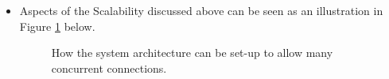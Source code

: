 		
\pagebreak	
\begin{itemize}
	\item Aspects of the Scalability discussed above can be seen as an illustration in Figure \ref{fig:scalability} below.
	\begin{figure}[H]
		\centering
		\caption{How the system architecture can be set-up to allow many concurrent connections.}
		\label{fig:scalability}
	\end{figure}
\end{itemize}